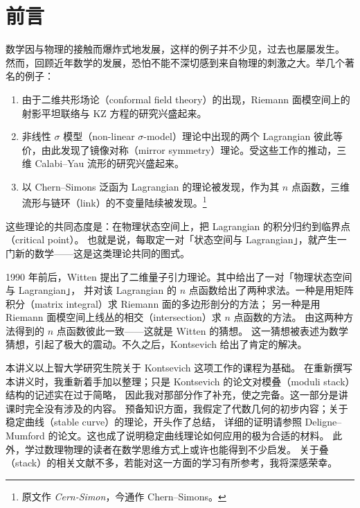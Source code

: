
\thispagestyle{plain}
\section*{前言}

数学因与物理的接触而爆炸式地发展，这样的例子并不少见，过去也屡屡发生。
然而，回顾近年数学的发展，恐怕不能不深切感到来自物理的刺激之大。举几个著名的例子：

\begin{enumerate}[label=(\arabic*),leftmargin=2.6em,itemsep=2pt,topsep=4pt]
\item 由于二维共形场论（conformal field theory）的出现，Riemann 面模空间上的射影平坦联络与 KZ 方程的研究兴盛起来。
\item 非线性 $\sigma$ 模型（non-linear $\sigma$-model）理论中出现的两个 Lagrangian 彼此等价，由此发现了镜像对称（mirror symmetry）理论。受这些工作的推动，三维 Calabi--Yau 流形的研究兴盛起来。
\item 以 Chern--Simons 泛函为 Lagrangian 的理论被发现，作为其 $n$ 点函数，三维流形与链环（link）的不变量陆续被发现。\footnote{原文作 \emph{Cern-Simon}，今通作 Chern--Simons。}
\end{enumerate}

这些理论的共同态度是：在物理状态空间上，把 Lagrangian 的积分归约到临界点（critical point）。
也就是说，每取定一对「状态空间与 Lagrangian」，就产生一门新的数学——这是这类理论共同的图式。

1990 年前后，Witten 提出了二维量子引力理论。其中给出了一对「物理状态空间与 Lagrangian」，
并对该 Lagrangian 的 $n$ 点函数给出了两种求法。一种是用矩阵积分（matrix integral）求 Riemann 面的多边形剖分的方法；
另一种是用 Riemann 面模空间上线丛的相交（intersection）求 $n$ 点函数的方法。
由这两种方法得到的 $n$ 点函数彼此一致——这就是 Witten 的猜想。
这一猜想被表述为数学猜想，引起了极大的震动。不久之后，Kontsevich 给出了肯定的解决。

本讲义以上智大学研究生院关于 Kontsevich 这项工作的课程为基础。
在重新撰写本讲义时，我重新着手加以整理；只是 Kontsevich 的论文对模叠（moduli stack）结构的记述实在过于简略，
因此我对那部分作了补充，使之完备。这一部分是讲课时完全没有涉及的内容。
预备知识方面，我假定了代数几何的初步内容；关于稳定曲线（stable curve）的理论，开头作了总结，
详细的证明请参照 Deligne--Mumford 的论文。这也成了说明稳定曲线理论如何应用的极为合适的材料。
此外，学过数理物理的读者在数学思维方式上或许也能得到不少启发。
关于叠（stack）的相关文献不多，若能对这一方面的学习有所参考，我将深感荣幸。

